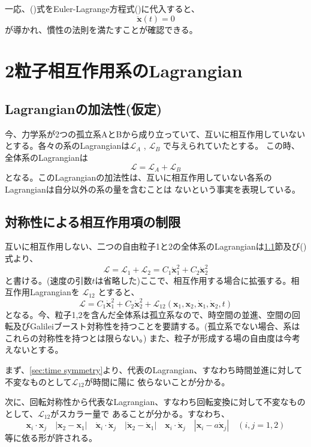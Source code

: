 \documentclass[a4paper,11pt]{ltjsarticle}
\newcommand{\La}{\mathcal{L}}
\begin{document}
一応、()式をEuler-Lagrange方程式()に代入すると、
\[
\ddot{\bm{x}}(t)=0
\]
が導かれ、慣性の法則を満たすことが確認できる。

\section{2粒子相互作用系のLagrangian}
\subsection{Lagrangianの加法性(仮定)}
\label{sec:Additive}
今、力学系が2つの孤立系AとBから成り立っていて、互いに相互作用していないとする。各々の系のLagrangianは$\La_A$ , $\La_B$
で与えられていたとする。
この時、全体系のLagrangianは
\[
\La=\La_A + \La_B
\]
となる。このLagrangianの加法性は、互いに相互作用していない各系のLagrangianは自分以外の系の量を含むことは
ないという事実を表現している。

\subsection{対称性による相互作用項の制限}
互いに相互作用しない、二つの自由粒子1と2の全体系のLagrangianは\ref{sec:Additive}節及び()式より、
\[
\La=\La_1 + \La_2 =C_1\dot{\bm{x}}_1^2+C_2\dot{\bm{x}}_2^2
\]
と書ける。(速度の引数$t$は省略した)ここで、相互作用する場合に拡張する。相互作用Lagrangianを $\La_{12}$ とすると、
\[
\La=C_1\dot{\bm{x}}_1^2+C_2\dot{\bm{x}}_2^2+\La_{12}(\bm{x}_1,\bm{x}_2,\dot{\bm{x}}_1,\dot{\bm{x}}_2,t)
\]
となる。今、粒子1,2を含んだ全体系は孤立系なので、時空間の並進、空間の回転及びGalileiブースト対称性を持つことを要請する。(孤立系でない場合、系はこれらの対称性を持つとは限らない。)
また、粒子が形成する場の自由度は今考えないとする。

まず、\ref{sec:time symmetry}より、代表のLagrangian、すなわち時間並進に対して不変なものとして$\La_{12}$が時間に陽に
依らないことが分かる。

次に、回転対称性から代表なLagrangian、すなわち回転変換に対して不変なものとして、$\La_{12}$がスカラー量で
あることが分かる。すなわち、
\[
\bm{x}_i\cdot\bm{x}_j \quad |\bm{x}_2-\bm{x}_1| \quad \dot{\bm{x}}_i\cdot\dot{\bm{x}}_j \quad |\dot{\bm{x}}_2-\dot{\bm{x}}_1|
\quad \bm{x}_i\cdot\dot{\bm{x}}_j \quad |\bm{x}_i-a\dot{\bm{x}}_j| \quad (i,j=1,2)
\]
等に依る形が許される。
\end{document}
